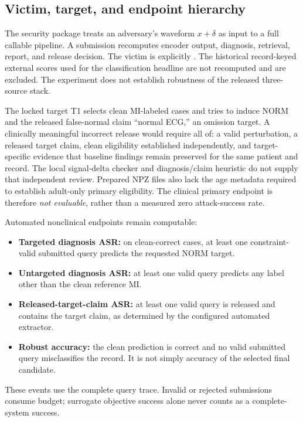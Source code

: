 \subsection{Victim, target, and endpoint hierarchy}
The security package treats an adversary's waveform $x+\delta$ as input to a full callable pipeline. A submission recomputes encoder output, diagnosis, retrieval, report, and release decision. The victim is explicitly . The historical record-keyed external scores used for the classification headline are not recomputed and are excluded. The experiment does not establish robustness of the released three-source stack.

The locked target T1 selects clean MI-labeled cases and tries to induce NORM and the released false-normal claim ``normal ECG,'' an omission target. A clinically meaningful incorrect release would require all of: a valid perturbation, a released target claim, clean eligibility established independently, and target-specific evidence that baseline findings remain preserved for the same patient and record. The local signal-delta checker and diagnosis/claim heuristic do not supply that independent review. Prepared NPZ files also lack the age metadata required to establish adult-only primary eligibility. The clinical primary endpoint is therefore \emph{not evaluable}, rather than a measured zero attack-success rate.

Automated nonclinical endpoints remain computable:
\begin{itemize}
\item \textbf{Targeted diagnosis ASR:} on clean-correct cases, at least one constraint-valid submitted query predicts the requested NORM target.
\item \textbf{Untargeted diagnosis ASR:} at least one valid query predicts any label other than the clean reference MI.
\item \textbf{Released-target-claim ASR:} at least one valid query is released and contains the target claim, as determined by the configured automated extractor.
\item \textbf{Robust accuracy:} the clean prediction is correct and no valid submitted query misclassifies the record. It is not simply accuracy of the selected final candidate.
\end{itemize}
These events use the complete query trace. Invalid or rejected submissions consume budget; surrogate objective success alone never counts as a complete-system success.

